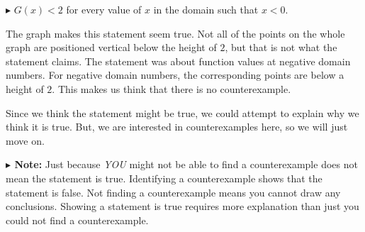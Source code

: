 \documentclass{ximera}
\begin{document}
\textbf{\textcolor{red!70!darkgray}{$\blacktriangleright$}} $G(x) < 2$  for every value of $x$ in the domain such that $x < 0$. 

The graph makes this statement seem true.  Not all of the points on the whole graph are positioned vertical below the height of $2$, but that is not what the statement claims. The statement was about function values at negative domain numbers. For negative domain numbers, the corresponding points are below a height of $2$.  This makes us think that there is no counterexample.  

Since we think the statement might be true, we could attempt to explain why we think it is true.  But, we are interested in counterexamples here, so we will just move on.








\textbf{$\blacktriangleright$ Note:}  Just because \textit{YOU} might not be able to find a counterexample does not mean the statement is true.  Identifying a counterexample shows that the statement is false. Not finding a counterexample means you cannot draw any conclusions.  Showing a statement is true requires more explanation than just you could not find a counterexample. 
\end{document}
